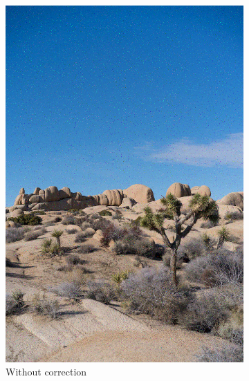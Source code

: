 \documentclass{article}
\begin{document}
\begin{figure}[htb]
\begin{subfigure}[b]{0.32\textwidth}
        \includegraphics[width=\textwidth]{../Result/Cyclic/15-11/cyclic-bsc-output.png}
        \caption{Without correction}
        \label{fig:image-cyclic-15-11-no-correction}
    \end{subfigure}
    \hfill
    \begin{subfigure}[b]{0.32\textwidth}
        \centering

\end{subfigure}
\end{figure}
\end{document}
